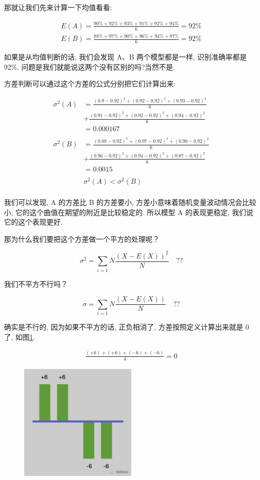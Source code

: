 那就让我们先来计算一下均值看看: 

\begin{align*}
  E(A) = \frac{90\% + 92\% + 93\% + 91\% + 92\% + 94\%}{6} = 92\% \\
  E(B) = \frac{88\% + 97\% + 90\% + 96\% + 94\% + 87\%}{6} = 92\% 
\end{align*}

如果是从均值判断的话, 我们会发现 A、B 两个模型都是一样, 识别准确率都是 92\%. 问题是我们就能说这两个没有区别的吗?当然不是. 

方差判断可以通过这个方差的公式分别把它们计算出来: 

\begin{align*}
  \sigma^2(A) & = \frac{(0.9-0.92)^2+(0.92-0.92)^2+(0.93-0.92)^2}{6} \\ & + \frac{(0.91-0.92)^2+(0.92-0.92)^2+(0.94-0.92)^2}{6} \\ & = 0.000167 \\ \\
  \sigma^2(B) & = \frac{(0.88-0.92)^2+(0.97-0.92)^2+(0.90-0.92)^2}{6} \\ & + \frac{(0.96-0.92)^2+(0.94-0.92)^2+(0.87-0.92)^2}{6} \\ & = 0.0015 \\ \\
  & \sigma^2(A) < \sigma^2(B) \\
\end{align*}

我们可以发现, A 的方差比 B 的方差要小, 方差小意味着随机变量波动情况会比较小, 它的这个曲值在期望的附近是比较稳定的. 所以模型 A 的表现更稳定, 我们说它的这个表现更好. 

那为什么我们要把这个方差做一个平方的处理呢？

\[
  \sigma ^2= \sum_{i=1}{N}\frac{(X-E(X))^2}{N} \quad ??
\]

我们不平方不行吗？

\[
  \sigma = \sum_{i=1}{N}\frac{(X-E(X))}{N}\quad ??
\]

确实是不行的, 因为如果不平方的话, 正负相消了, 方差按照定义计算出来就是 0 了, 如图\ref{fig:img22_2}. 

\begin{align*}
  \frac{(+6)+(+6)+(-6)+(-6)}{4} = 0
\end{align*}

\begin{figure}[ht]
  \centering
  \includegraphics[width=0.5\textwidth]{asset/snap2023-12-29_02.10.20.png}
  \caption{}
  \label{fig:img22_2}
\end{figure}

